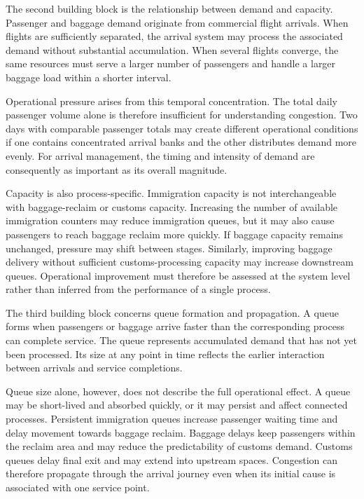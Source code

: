 The second building block is the relationship between demand and capacity. Passenger and baggage demand originate from commercial flight arrivals. When flights are sufficiently separated, the arrival system may process the associated demand without substantial accumulation. When several flights converge, the same resources must serve a larger number of passengers and handle a larger baggage load within a shorter interval.

Operational pressure arises from this temporal concentration. The total daily passenger volume alone is therefore insufficient for understanding congestion. Two days with comparable passenger totals may create different operational conditions if one contains concentrated arrival banks and the other distributes demand more evenly. For arrival management, the timing and intensity of demand are consequently as important as its overall magnitude.

Capacity is also process-specific. Immigration capacity is not interchangeable with baggage-reclaim or customs capacity. Increasing the number of available immigration counters may reduce immigration queues, but it may also cause passengers to reach baggage reclaim more quickly. If baggage capacity remains unchanged, pressure may shift between stages. Similarly, improving baggage delivery without sufficient customs-processing capacity may increase downstream queues. Operational improvement must therefore be assessed at the system level rather than inferred from the performance of a single process.

The third building block concerns queue formation and propagation. A queue forms when passengers or baggage arrive faster than the corresponding process can complete service. The queue represents accumulated demand that has not yet been processed. Its size at any point in time reflects the earlier interaction between arrivals and service completions.

Queue size alone, however, does not describe the full operational effect. A queue may be short-lived and absorbed quickly, or it may persist and affect connected processes. Persistent immigration queues increase passenger waiting time and delay movement towards baggage reclaim. Baggage delays keep passengers within the reclaim area and may reduce the predictability of customs demand. Customs queues delay final exit and may extend into upstream spaces. Congestion can therefore propagate through the arrival journey even when its initial cause is associated with one service point.

